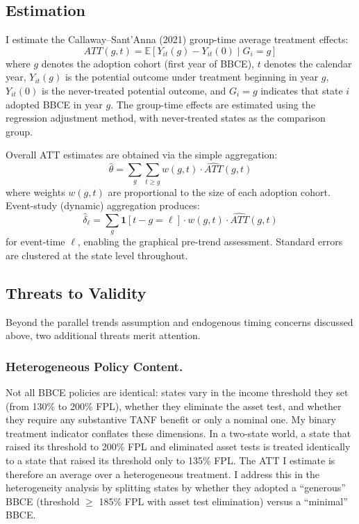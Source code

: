 \documentclass[12pt]{article}
\newcommand{\E}{\mathbb{E}}
\begin{document}
\subsection{Estimation}

I estimate the Callaway--Sant'Anna (2021) group-time average treatment effects:
\begin{equation}
ATT(g,t) = \E[Y_{it}(g) - Y_{it}(0) \mid G_i = g]
\end{equation}
where $g$ denotes the adoption cohort (first year of BBCE), $t$ denotes the calendar year, $Y_{it}(g)$ is the potential outcome under treatment beginning in year $g$, $Y_{it}(0)$ is the never-treated potential outcome, and $G_i = g$ indicates that state $i$ adopted BBCE in year $g$. The group-time effects are estimated using the regression adjustment method, with never-treated states as the comparison group.

Overall ATT estimates are obtained via the simple aggregation:
\begin{equation}
\hat{\theta} = \sum_{g} \sum_{t \geq g} w(g,t) \cdot \widehat{ATT}(g,t)
\end{equation}
where weights $w(g,t)$ are proportional to the size of each adoption cohort. Event-study (dynamic) aggregation produces:
\begin{equation}
\hat{\delta}_\ell = \sum_{g} \mathbf{1}[t - g = \ell] \cdot w(g,t) \cdot \widehat{ATT}(g,t)
\end{equation}
for event-time $\ell$, enabling the graphical pre-trend assessment. Standard errors are clustered at the state level throughout.

\subsection{Threats to Validity}

Beyond the parallel trends assumption and endogenous timing concerns discussed above, two additional threats merit attention.

\subsubsection*{Heterogeneous Policy Content.} Not all BBCE policies are identical: states vary in the income threshold they set (from 130\% to 200\% FPL), whether they eliminate the asset test, and whether they require any substantive TANF benefit or only a nominal one. My binary treatment indicator conflates these dimensions. In a two-state world, a state that raised its threshold to 200\% FPL and eliminated asset tests is treated identically to a state that raised its threshold only to 135\% FPL. The ATT I estimate is therefore an average over a heterogeneous treatment. I address this in the heterogeneity analysis by splitting states by whether they adopted a ``generous'' BBCE (threshold $\geq$ 185\% FPL with asset test elimination) versus a ``minimal'' BBCE.
\end{document}
